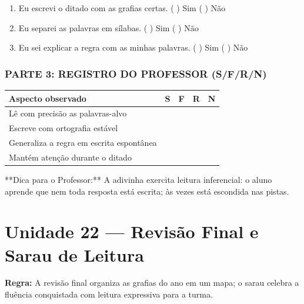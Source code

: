 \begin{exercicio}
\begin{enumerate}[label=\alph*)]
  \item Eu escrevi o ditado com as grafias certas.  \quad ( ) Sim   ( ) Não

  \item Eu separei as palavras em sílabas.  \quad ( ) Sim   ( ) Não

  \item Eu sei explicar a regra com as minhas palavras.  \quad ( ) Sim   ( ) Não

\end{enumerate}

\subsection*{PARTE 3: REGISTRO DO PROFESSOR (S/F/R/N)}

\begin{center}
\renewcommand{\arraystretch}{1.4}
\begin{tabular}{@{}p{9cm}cccc@{}}
\toprule
Aspecto observado & S & F & R & N \\
\midrule
Lê com precisão as palavras-alvo & & & & \\
Escreve com ortografia estável & & & & \\
Generaliza a regra em escrita espontânea & & & & \\
Mantém atenção durante o ditado & & & & \\
\bottomrule\end{tabular}\end{center}

\end{exercicio}

\begin{dica}
**Dica para o Professor:** A adivinha exercita leitura inferencial: o aluno aprende que nem toda resposta está escrita; às vezes está escondida nas pistas.
\end{dica}


\chapter{Unidade 22 --- Revisão Final e Sarau de Leitura}


\textbf{Regra:} A revisão final organiza as grafias do ano em um mapa; o sarau celebra a fluência conquistada com leitura expressiva para a turma.

